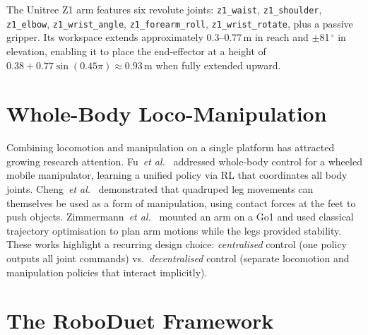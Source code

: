 The Unitree Z1 arm features six revolute joints:
\texttt{z1\_waist}, \texttt{z1\_shoulder}, \texttt{z1\_elbow},
\texttt{z1\_wrist\_angle}, \texttt{z1\_forearm\_roll},
\texttt{z1\_wrist\_rotate}, plus a passive gripper.
Its workspace extends approximately 0.3--0.77\,m in reach and $\pm$81\,$^\circ$
in elevation, enabling it to place the end-effector at a height of
$0.38 + 0.77\sin(0.45\pi) \approx 0.93$\,m when fully extended upward.

\section{Whole-Body Loco-Manipulation}

Combining locomotion and manipulation on a single platform has attracted
growing research attention.
Fu~\emph{et al.}~\cite{fu2023deepwhole} addressed whole-body control for a
wheeled mobile manipulator, learning a unified policy via RL that coordinates
all body joints.
Cheng~\emph{et al.}~\cite{cheng2023legs} demonstrated that quadruped leg
movements can themselves be used as a form of manipulation, using contact
forces at the feet to push objects.
Zimmermann~\emph{et al.}~\cite{zimmermann2021go} mounted an arm on a Go1 and
used classical trajectory optimisation to plan arm motions while the legs
provided stability.
These works highlight a recurring design choice: \emph{centralised} control
(one policy outputs all joint commands) vs.\ \emph{decentralised} control
(separate locomotion and manipulation policies that interact implicitly).

\section{The RoboDuet Framework}

